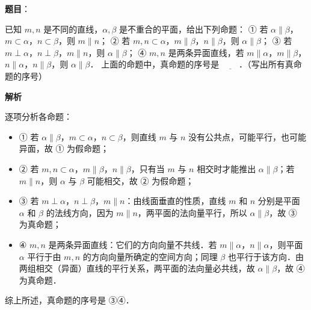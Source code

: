 \begin{answer}

\textbf{题目}：

已知 $m, n$ 是不同的直线，$\alpha, \beta$ 是不重合的平面，给出下列命题：
① 若 $\alpha \parallel \beta$，$m \subset \alpha$，$n \subset \beta$，则 $m \parallel n$；
② 若 $m, n \subset \alpha$，$m \parallel \beta$，$n \parallel \beta$，则 $\alpha \parallel \beta$；
③ 若 $m \perp \alpha$，$n \perp \beta$，$m \parallel n$，则 $\alpha \parallel \beta$；
④ $m, n$ 是两条异面直线，若 $m \parallel \alpha$，$m \parallel \beta$，$n \parallel \alpha$，$n \parallel \beta$，则 $\alpha \parallel \beta$．
上面的命题中，真命题的序号是 $\underline{\hspace{2em}}$．（写出所有真命题的序号）

\textbf{解析}

逐项分析各命题：
\begin{itemize}
\item ① 若 $\alpha \parallel \beta$，$m \subset \alpha$，$n \subset \beta$，则直线 $m$ 与 $n$ 没有公共点，可能平行，也可能异面，故 ① 为假命题；
\item ② 若 $m, n \subset \alpha$，$m \parallel \beta$，$n \parallel \beta$，只有当 $m$ 与 $n$ 相交时才能推出 $\alpha \parallel \beta$；若 $m \parallel n$，则 $\alpha$ 与 $\beta$ 可能相交，故 ② 为假命题；
\item ③ 若 $m \perp \alpha$，$n \perp \beta$，$m \parallel n$：由线面垂直的性质，直线 $m$ 和 $n$ 分别是平面 $\alpha$ 和 $\beta$ 的法线方向，因为 $m \parallel n$，两平面的法向量平行，所以 $\alpha \parallel \beta$，故 ③ 为真命题；
\item ④ $m, n$ 是两条异面直线：它们的方向向量不共线．若 $m \parallel \alpha$，$n \parallel \alpha$，则平面 $\alpha$ 平行于由 $m, n$ 的方向向量所确定的空间方向；同理 $\beta$ 也平行于该方向．由两组相交（异面）直线的平行关系，两平面的法向量必共线，故 $\alpha \parallel \beta$，故 ④ 为真命题．
\end{itemize}
综上所述，真命题的序号是 ③④．


\end{answer}
